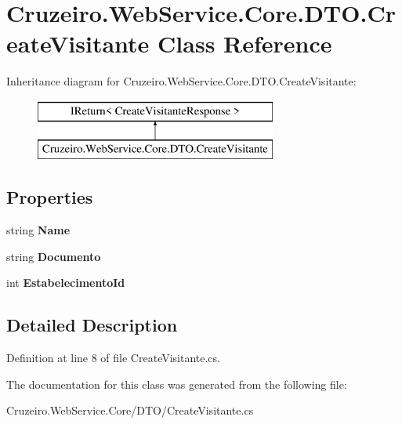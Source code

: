 \hypertarget{class_cruzeiro_1_1_web_service_1_1_core_1_1_d_t_o_1_1_create_visitante}{}\section{Cruzeiro.\+Web\+Service.\+Core.\+D\+T\+O.\+Create\+Visitante Class Reference}
\label{class_cruzeiro_1_1_web_service_1_1_core_1_1_d_t_o_1_1_create_visitante}
Inheritance diagram for Cruzeiro.\+Web\+Service.\+Core.\+D\+T\+O.\+Create\+Visitante\+:\begin{figure}[H]
\begin{center}
\leavevmode
\includegraphics[height=2.000000cm]{class_cruzeiro_1_1_web_service_1_1_core_1_1_d_t_o_1_1_create_visitante}
\end{center}
\end{figure}
\subsection*{Properties}
\begin{DoxyCompactItemize}
\item 
string {\bfseries Name}\hypertarget{class_cruzeiro_1_1_web_service_1_1_core_1_1_d_t_o_1_1_create_visitante_aa4831d7b60ff7fa3883ee1c0065add5b}{}\label{class_cruzeiro_1_1_web_service_1_1_core_1_1_d_t_o_1_1_create_visitante_aa4831d7b60ff7fa3883ee1c0065add5b}

\item 
string {\bfseries Documento}\hypertarget{class_cruzeiro_1_1_web_service_1_1_core_1_1_d_t_o_1_1_create_visitante_a16f5772811d1155f121fad4d2a35c229}{}\label{class_cruzeiro_1_1_web_service_1_1_core_1_1_d_t_o_1_1_create_visitante_a16f5772811d1155f121fad4d2a35c229}

\item 
int {\bfseries Estabelecimento\+Id}\hypertarget{class_cruzeiro_1_1_web_service_1_1_core_1_1_d_t_o_1_1_create_visitante_a8b769c0df79d224c85bc53c7f09bb18f}{}\label{class_cruzeiro_1_1_web_service_1_1_core_1_1_d_t_o_1_1_create_visitante_a8b769c0df79d224c85bc53c7f09bb18f}

\end{DoxyCompactItemize}


\subsection{Detailed Description}


Definition at line 8 of file Create\+Visitante.\+cs.



The documentation for this class was generated from the following file\+:\begin{DoxyCompactItemize}
\item 
Cruzeiro.\+Web\+Service.\+Core/\+D\+T\+O/Create\+Visitante.\+cs\end{DoxyCompactItemize}
